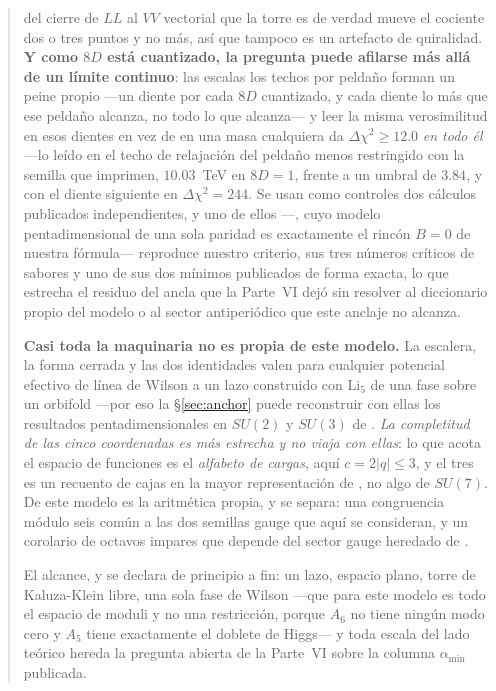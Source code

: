 \documentclass[11pt,a4paper]{article}
\newcommand{\su}[1]{SU(#1)}
\newcommand{\amin}{\alpha_{\min}}
\begin{document}
\begin{abstract}
del cierre de $LL$ al $VV$ vectorial que la torre es de verdad mueve el cociente dos o tres puntos
y no más, así que tampoco es un artefacto de quiralidad. \textbf{Y como $8D$
está cuantizado, la pregunta puede afilarse más allá de un límite continuo}: las escalas
los techos por peldaño forman un peine propio ---un diente por cada $8D$ cuantizado, y cada
diente lo más que ese peldaño alcanza, no todo lo que alcanza--- y leer la misma verosimilitud
en esos dientes en vez de en una masa cualquiera da $\Delta\chi^2\ge12.0$ \emph{en todo él} ---lo
leído en el techo de relajación del peldaño menos restringido con la semilla que \cite{KM25}
imprimen, $10.03$~TeV en $8D=1$, frente a un umbral de $3.84$, y con el
diente siguiente en $\Delta\chi^2=244$. Se usan como controles dos cálculos publicados independientes, y
uno de ellos ---\cite{vGIQ}, cuyo modelo pentadimensional de una sola paridad es exactamente el
rincón $B=0$ de nuestra fórmula--- reproduce nuestro criterio, sus tres números críticos de
sabores y uno de sus dos mínimos publicados de forma exacta, lo que estrecha el residuo del ancla
que la Parte~VI dejó sin resolver al diccionario propio del modelo o al sector antiperiódico que
este anclaje no alcanza.

\textbf{Casi toda la maquinaria no es propia de este modelo.} La escalera, la forma cerrada y las
dos identidades valen para cualquier potencial efectivo
de línea de Wilson a un lazo construido con $\mathrm{Li}_5$ de una fase sobre un orbifold ---por
eso la \S\ref{sec:anchor} puede reconstruir con ellas los resultados pentadimensionales en $\su2$ y
$\su3$ de \cite{vGIQ}. \emph{La completitud de las cinco coordenadas es más estrecha y no viaja
con ellas}: lo que acota el espacio de funciones es el \emph{alfabeto de cargas}, aquí
$c=2|q|\le3$, y el tres es un recuento de cajas en la mayor representación de \cite{KM25}, no algo
de $\su7$. De este modelo es la aritmética propia, y se separa: una congruencia módulo seis
común a las dos semillas gauge que aquí se consideran, y un corolario de octavos impares
que depende del sector gauge
heredado de \cite{KM25}.

El alcance, y se declara de principio a fin:
un lazo, espacio plano, torre de Kaluza-Klein libre, una sola fase de Wilson ---que para este modelo
es todo el espacio de moduli y no una restricción, porque $A_6$ no tiene ningún modo cero y $A_5$
tiene exactamente el doblete de Higgs--- y toda escala del lado teórico
hereda la pregunta abierta de la Parte~VI sobre la columna $\amin$ publicada.
\end{abstract}
\end{document}
